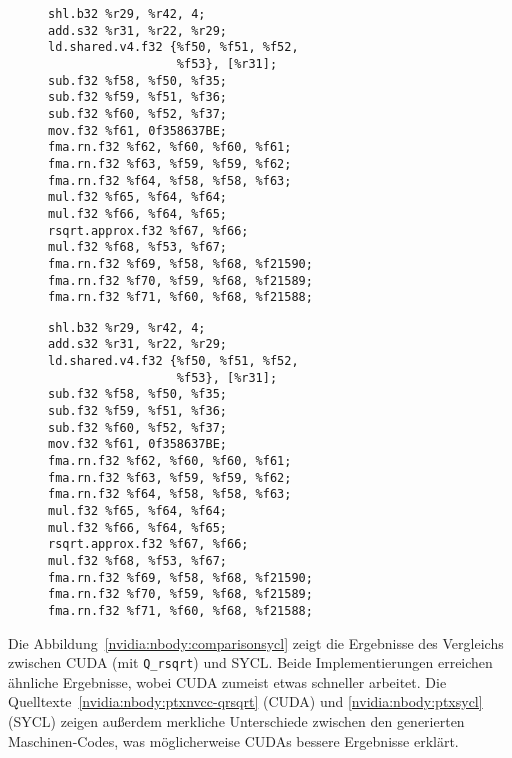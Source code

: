 \begin{figure}
    \begin{minipage}{0.5\textwidth}
        \centering
        \begin{verbatim}
shl.b32 %r29, %r42, 4;
add.s32 %r31, %r22, %r29;
ld.shared.v4.f32 {%f50, %f51, %f52,
                  %f53}, [%r31];
sub.f32 %f58, %f50, %f35;
sub.f32 %f59, %f51, %f36;
sub.f32 %f60, %f52, %f37;
mov.f32 %f61, 0f358637BE;
fma.rn.f32 %f62, %f60, %f60, %f61;
fma.rn.f32 %f63, %f59, %f59, %f62;
fma.rn.f32 %f64, %f58, %f58, %f63;
mul.f32 %f65, %f64, %f64;
mul.f32 %f66, %f64, %f65;
rsqrt.approx.f32 %f67, %f66;
mul.f32 %f68, %f53, %f67;
fma.rn.f32 %f69, %f58, %f68, %f21590;
fma.rn.f32 %f70, %f59, %f68, %f21589;
fma.rn.f32 %f71, %f60, %f68, %f21588;
        \end{verbatim}
        \label{nvidia:nbody:ptxnvcc}
    \end{minipage}
    \begin{minipage}{0.5\textwidth}
        \centering
        \begin{verbatim}
shl.b32 %r29, %r42, 4;
add.s32 %r31, %r22, %r29;
ld.shared.v4.f32 {%f50, %f51, %f52,
                  %f53}, [%r31];
sub.f32 %f58, %f50, %f35;
sub.f32 %f59, %f51, %f36;
sub.f32 %f60, %f52, %f37;
mov.f32 %f61, 0f358637BE;
fma.rn.f32 %f62, %f60, %f60, %f61;
fma.rn.f32 %f63, %f59, %f59, %f62;
fma.rn.f32 %f64, %f58, %f58, %f63;
mul.f32 %f65, %f64, %f64;
mul.f32 %f66, %f64, %f65;
rsqrt.approx.f32 %f67, %f66;
mul.f32 %f68, %f53, %f67;
fma.rn.f32 %f69, %f58, %f68, %f21590;
fma.rn.f32 %f70, %f59, %f68, %f21589;
fma.rn.f32 %f71, %f60, %f68, %f21588;
        \end{verbatim}
        \label{nvidia:nbody:ptxhip}
    \end{minipage}
\end{figure}

Die Abbildung~\ref{nvidia:nbody:comparisonsycl} zeigt die Ergebnisse des
Vergleichs zwischen CUDA (mit \texttt{Q\_rsqrt}) und SYCL. Beide
Implementierungen erreichen ähnliche Ergebnisse, wobei CUDA zumeist etwas
schneller arbeitet. Die Quelltexte~\ref{nvidia:nbody:ptxnvcc-qrsqrt} (CUDA) und
\ref{nvidia:nbody:ptxsycl} (SYCL) zeigen außerdem merkliche Unterschiede
zwischen den generierten Maschinen-Codes, was möglicherweise CUDAs bessere
Ergebnisse erklärt.

